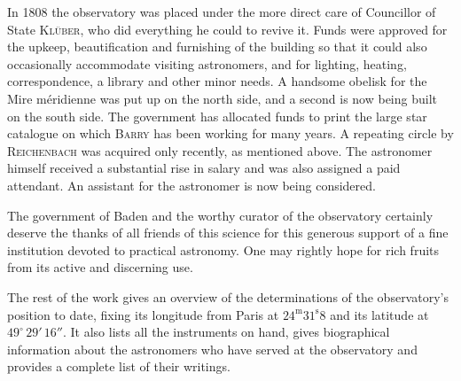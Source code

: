 In 1808 the observatory was placed under the more direct care of Councillor of State \textsc{Klüber}, who did everything he could to revive it. Funds were approved for the upkeep, beautification and furnishing of the building so that it could also occasionally accommodate visiting astronomers, and for lighting, heating, correspondence, a library and other minor needs. A handsome obelisk for the Mire méridienne was put up on the north side, and a second is now being built on the south side. The government has allocated funds to print the large star catalogue on which \textsc{Barry} has been working for many years. A repeating circle by \textsc{Reichenbach} was acquired only recently, as mentioned above. The astronomer himself received a substantial rise in salary and was also assigned a paid attendant. An assistant for the astronomer is now being considered.

The government of Baden and the worthy curator of the observatory certainly deserve the thanks of all friends of this science for this generous support of a fine institution devoted to practical astronomy. One may rightly hope for rich fruits from its active and discerning use.

The rest of the work gives an overview of the determinations of the observatory's position to date, fixing its longitude from Paris at $24^{\mathrm m}31^{\mathrm s}8$ and its latitude at $49^\circ\,29'\,16''$. It also lists all the instruments on hand, gives biographical information about the astronomers who have served at the observatory and provides a complete list of their writings.
